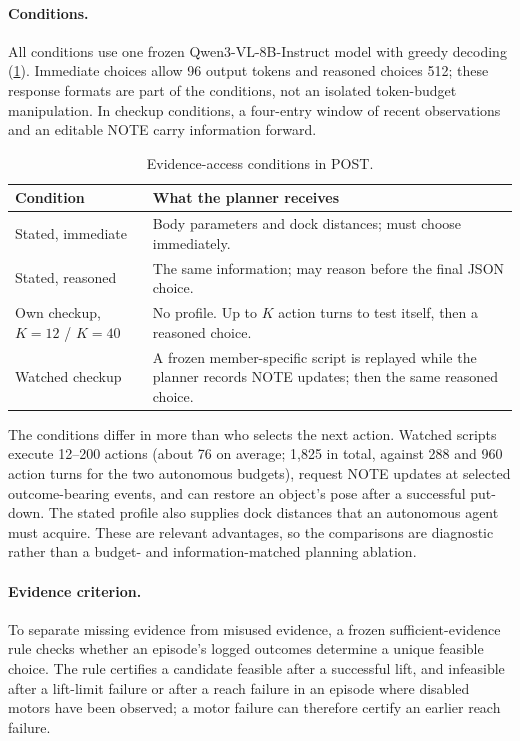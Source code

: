 \documentclass{article}
\begin{document}
\paragraph{Conditions.} All conditions use one frozen Qwen3-VL-8B-Instruct model \citep{bai2025qwen3vl} with greedy decoding (\cref{tab:conditions}). Immediate choices allow 96 output tokens and reasoned choices 512; these response formats are part of the conditions, not an isolated token-budget manipulation. In checkup conditions, a four-entry window of recent observations and an editable NOTE carry information forward.

\begin{table}[t]
\centering
\caption{Evidence-access conditions in POST.}
\label{tab:conditions}
\small
\begin{tabular}{p{3.3cm}p{9.3cm}}
\toprule
Condition & What the planner receives \\
\midrule
Stated, immediate & Body parameters and dock distances; must choose immediately. \\
Stated, reasoned & The same information; may reason before the final JSON choice. \\
Own checkup, $K=12$ / $K=40$ & No profile. Up to $K$ action turns to test itself, then a reasoned choice. \\
Watched checkup & A frozen member-specific script is replayed while the planner records NOTE updates; then the same reasoned choice. \\
\bottomrule
\end{tabular}
\end{table}

The conditions differ in more than who selects the next action. Watched scripts execute 12--200 actions (about 76 on average; 1,825 in total, against 288 and 960 action turns for the two autonomous budgets), request NOTE updates at selected outcome-bearing events, and can restore an object's pose after a successful put-down. The stated profile also supplies dock distances that an autonomous agent must acquire. These are relevant advantages, so the comparisons are diagnostic rather than a budget- and information-matched planning ablation.

\paragraph{Evidence criterion.} To separate missing evidence from misused evidence, a frozen sufficient-evidence rule checks whether an episode's logged outcomes determine a unique feasible choice. The rule certifies a candidate feasible after a successful lift, and infeasible after a lift-limit failure or after a reach failure in an episode where disabled motors have been observed; a motor failure can therefore certify an earlier reach failure.
\end{document}
